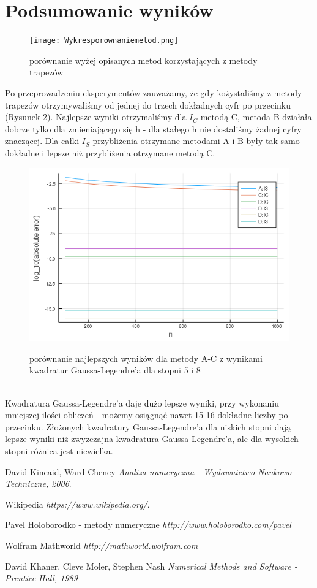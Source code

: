 \documentclass{article}
\begin{document}
\section*{Podsumowanie wyników}
\begin{figure}[ht]
    \texttt{[image: Wykresporownaniemetod.png]}
    \label{wykresABC}
    \caption{porównanie wyżej opisanych metod korzystających z metody trapezów}
\end{figure}
Po przeprowadzeniu eksperymentów zauważamy, że gdy kożystaliśmy z metody trapezów otrzymywaliśmy od jednej do trzech dokładnych cyfr po przecinku (Rysunek 2). Najlepsze wyniki otrzymaliśmy dla $I_C$ metodą C, metoda B działała dobrze tylko dla zmieniającego się h - dla stałego h nie dostaliśmy żadnej cyfry znaczącej. Dla całki $I_S$ przybliżenia otrzymane metodami A i B były tak samo dokładne i lepsze niż przybliżenia otrzymane metodą C.
\begin{figure}[ht]
    \includegraphics[scale=0.5]{WykresporownaniemetodABC-D.png}
    \label{wykresABC-D}
    \caption{porównanie najlepszych wyników dla metody A-C z wynikami kwadratur Gaussa-Legendre'a dla stopni 5 i 8}
\end{figure}\\
Kwadratura Gaussa-Legendre'a daje dużo lepsze wyniki, przy wykonaniu mniejszej ilości obliczeń - możemy osiągnąć nawet 15-16 dokładne liczby po przecinku. Złożonych kwadratury Gaussa-Legendre'a dla niskich stopni dają lepsze wyniki niż zwyzczajna kwadratura Gaussa-Legendre'a, ale dla wysokich stopni różnica jest niewielka.
\begin{thebibliography}{9}

  
  David Kincaid, Ward Cheney
  \emph{Analiza numeryczna - Wydawnictwo Naukowo-Techniczne, 2006}.

  Wikipedia
  \emph{https://www.wikipedia.org/}.

	Pavel Holoborodko - metody numeryczne
		\emph{http://www.holoborodko.com/pavel}

	Wolfram Mathworld
		\emph{http://mathworld.wolfram.com}

	David Khaner, Cleve Moler, Stephen Nash
	\emph{Numerical Methods and Software - Prentice-Hall, 1989}
\end{thebibliography}
\end{document}
